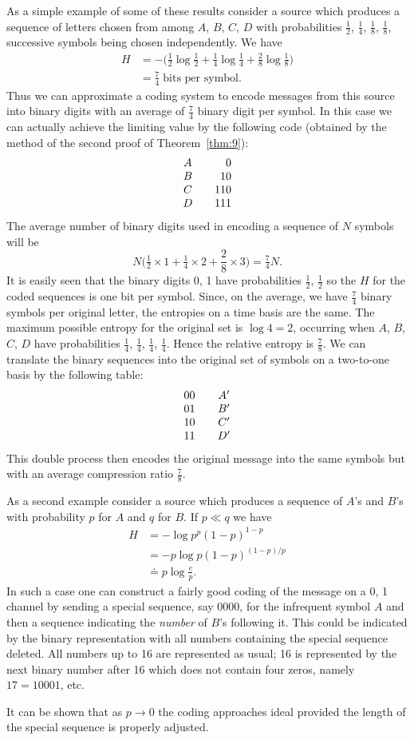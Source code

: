 As a simple example of some of these results consider a source which
produces a sequence of letters chosen from among $A$, $B$, $C$, $D$ with
probabilities $\frac12$, $\frac14$, $\frac18$, $\frac18$, successive
symbols being chosen independently.  We have
\begin{align*}
H &=-\bigl(\tfrac12\log\tfrac12
	+\tfrac14\log\tfrac14+\tfrac28\log\tfrac18\bigr) \\
  &=\tfrac74\;\text{bits per symbol}.
\end{align*}
Thus we can approximate a coding system to encode messages from this
source into binary digits with an average of $\frac74$ binary digit
per symbol.  In this case we can actually achieve the limiting value
by the following code (obtained by the method of the second proof of
Theorem~\ref{thm:9}):
$$
\begin{array}{c@{\hspace{2em}}r}
A & 0 \\
B & 10 \\
C & 110 \\
D & 111
\end{array}
$$
The average number of binary digits used in encoding a sequence of $N$ symbols will be
$$
N \bigl(\tfrac12 \times 1 + \tfrac14 \times 2 + \frac28 \times 3 \bigr)
	 = \tfrac74 N.
$$
It is easily seen that the binary digits 0, 1 have probabilities
$\frac12$, $\frac12$ so the $H$ for the coded sequences is one bit
per symbol.  Since, on the average, we have $\frac74$ binary symbols
per original letter, the entropies on a time basis are the same.
The maximum possible entropy for the original set is $\log 4=2$, occurring
when $A$, $B$, $C$, $D$ have probabilities $\frac14$, $\frac14$,
$\frac14$, $\frac14$.  Hence the relative entropy is
$\frac78$.  We can translate the binary sequences into the original
set of symbols on a two-to-one basis by the following table:
$$
\begin{array}{c@{\hspace{2em}}c}
00 & A' \\
01 & B' \\
10 & C' \\
11 & D'
\end{array}
$$
This double process then encodes the original message into the same
symbols but with an average compression ratio $\frac78$.

As a second example consider a source which produces a sequence of $A$'s
and $B$'s with probability $p$ for $A$ and $q$ for $B$.  If $p \ll q$ we have
\begin{align*}
H &= - \log p^p (1-p)^{1-p} \\
&= - p \log p(1-p)^{(1-p)/p} \\
&\doteq p \log \frac e p.
\end{align*}
In such a case one can construct a fairly good coding of the message on a
0, 1 channel by sending a special sequence, say 0000, for the infrequent
symbol $A$ and then a sequence indicating the \emph{number} of $B$'s
following it.  This could be indicated by the binary representation with
all numbers containing the special sequence deleted.  All numbers up to
16 are represented as usual; 16 is represented by the next binary number
after 16 which does not contain four zeros, namely $17 = 10001$, etc.

It can be shown that as $p \to 0$ the coding approaches ideal provided
the length of the special sequence is properly adjusted.

